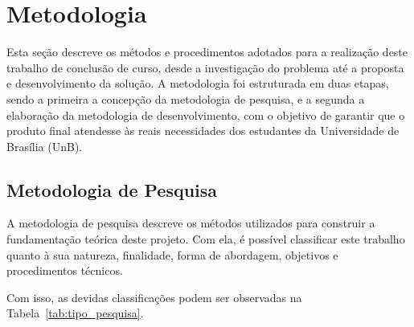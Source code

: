 \chapter[Metodologia]{Metodologia}

Esta seção descreve os métodos e procedimentos adotados para a realização deste trabalho de conclusão de curso, desde a investigação do problema até a proposta e desenvolvimento da solução. A metodologia foi estruturada em duas etapas, sendo a primeira a concepção da metodologia de pesquisa, e a segunda a elaboração da metodologia de desenvolvimento, com o objetivo de garantir que o produto final atendesse às reais necessidades dos estudantes da Universidade de Brasília (UnB).

\section{Metodologia de Pesquisa}

A metodologia de pesquisa descreve os métodos utilizados para construir a fundamentação teórica deste projeto. Com ela, é possível classificar este trabalho quanto à sua natureza, finalidade, forma de abordagem, objetivos e procedimentos técnicos.

Com isso, as devidas classificações podem ser observadas na Tabela~\ref{tab:tipo_pesquisa}.

\setlength{\extrarowheight}{5pt}


